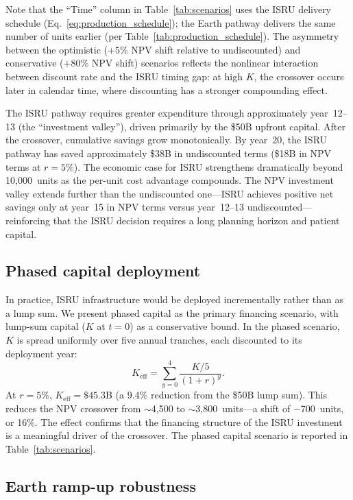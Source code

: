 \documentclass[preprint,12pt]{elsarticle}
\begin{document}
Note that the ``Time'' column in Table~\ref{tab:scenarios} uses the ISRU delivery schedule (Eq.~\ref{eq:production_schedule}); the Earth pathway delivers the same number of units earlier (per Table~\ref{tab:production_schedule}). The asymmetry between the optimistic ($+5\%$ NPV shift relative to undiscounted) and conservative ($+80\%$ NPV shift) scenarios reflects the nonlinear interaction between discount rate and the ISRU timing gap: at high $K$, the crossover occurs later in calendar time, where discounting has a stronger compounding effect.

The ISRU pathway requires greater expenditure through approximately year~12--13 (the ``investment valley''), driven primarily by the \$50B upfront capital. After the crossover, cumulative savings grow monotonically. By year~20, the ISRU pathway has saved approximately \$38B in undiscounted terms (\$18B in NPV terms at $r = 5\%$). The economic case for ISRU strengthens dramatically beyond 10{,}000~units as the per-unit cost advantage compounds. The NPV investment valley extends further than the undiscounted one---ISRU achieves positive net savings only at year~15 in NPV terms versus year~12--13 undiscounted---reinforcing that the ISRU decision requires a long planning horizon and patient capital.

\subsection{Phased capital deployment}
\label{sec:phased_capital}

In practice, ISRU infrastructure would be deployed incrementally rather than as a lump sum. We present phased capital as the primary financing scenario, with lump-sum capital ($K$ at $t = 0$) as a conservative bound. In the phased scenario, $K$ is spread uniformly over five annual tranches, each discounted to its deployment year:
\begin{equation}
  K_{\mathrm{eff}} = \sum_{y=0}^{4} \frac{K/5}{(1+r)^y}.
  \label{eq:phased_capital}
\end{equation}
At $r = 5\%$, $K_{\mathrm{eff}} = \$45.3$B (a 9.4\% reduction from the \$50B lump sum). This reduces the NPV crossover from $\sim$4{,}500 to $\sim$3{,}800~units---a shift of $-$700~units, or 16\%. The effect confirms that the financing structure of the ISRU investment is a meaningful driver of the crossover. The phased capital scenario is reported in Table~\ref{tab:scenarios}.

\subsection{Earth ramp-up robustness}
\label{sec:earth_ramp}
\end{document}
